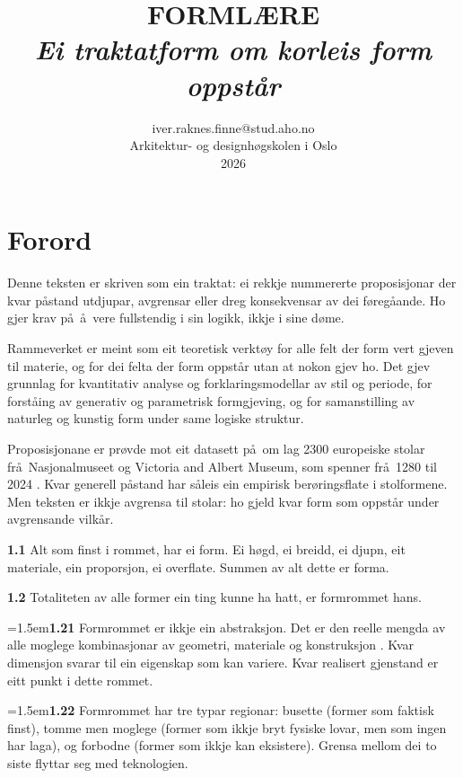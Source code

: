 \documentclass[11pt, a4paper]{article}
\title{%
  \vspace{-1cm}
  {\huge\textbf{FORML\AE RE}}\\[0.5em]
  {\large\textit{Ei traktatform om korleis form oppst\aa r}}
}
\author{
  iver.raknes.finne@stud.aho.no\\
  Arkitektur- og designh\o gskolen i Oslo\\
  2026
}
\date{}
\newcommand{\prop}[1]{\bigskip\noindent{\Large\textbf{#1}}\medskip\par}
\newcommand{\subprop}[1]{\medskip\noindent\textbf{#1}\quad}
\newcommand{\subsubprop}[1]{\smallskip\hangindent=1.5em\noindent\hspace{1.5em}\textbf{#1}\quad}
\begin{document}
\maketitle
\thispagestyle{empty}

\section*{Forord}

Denne teksten er skriven som ein traktat: ei rekkje nummererte proposisjonar der kvar p\aa stand utdjupar, avgrensar eller dreg konsekvensar av dei f\o reg\aa ande. Ho gjer krav p\aa\ \aa\ vere fullstendig i sin logikk, ikkje i sine d\o me.

Rammeverket er meint som eit teoretisk verkt\o y for alle felt der form vert gjeven til materie, og for dei felta der form oppst\aa r utan at nokon gjev ho. Det gjev grunnlag for kvantitativ analyse og forklaringsmodellar av stil og periode, for forst\aa ing av generativ og parametrisk formgjeving, og for samanstilling av naturleg og kunstig form under same logiske struktur.

Proposisjonane er pr\o vde mot eit datasett p\aa\ om lag 2300 europeiske stolar fr\aa\ Nasjonalmuseet og Victoria and Albert Museum, som spenner fr\aa\ 1280 til 2024 \citep{finne2026}. Kvar generell p\aa stand har s\aa leis ein empirisk ber\o ringsflate i stolformene. Men teksten er ikkje avgrensa til stolar: ho gjeld kvar form som oppst\aa r under avgrensande vilk\aa r.

\newpage
\tableofcontents
\newpage

\prop{1 Ting har former.}

\subprop{1.1} Alt som finst i rommet, har ei form. Ei h\o gd, ei breidd, ei djupn, eit materiale, ein proporsjon, ei overflate. Summen av alt dette er forma.

\subprop{1.2} Totaliteten av alle former ein ting kunne ha hatt, er formrommet hans.

\subsubprop{1.21} Formrommet er ikkje ein abstraksjon. Det er den reelle mengda av alle moglege kombinasjonar av geometri, materiale og konstruksjon \citep[jf.][]{raup1966, thompson1917}. Kvar dimensjon svarar til ein eigenskap som kan variere. Kvar realisert gjenstand er eitt punkt i dette rommet.

\subsubprop{1.22} Formrommet har tre typar regionar: busette (former som faktisk finst), tomme men moglege (former som ikkje bryt fysiske lovar, men som ingen har laga), og forbodne (former som ikkje kan eksistere). Grensa mellom dei to siste flyttar seg med teknologien.
\end{document}
